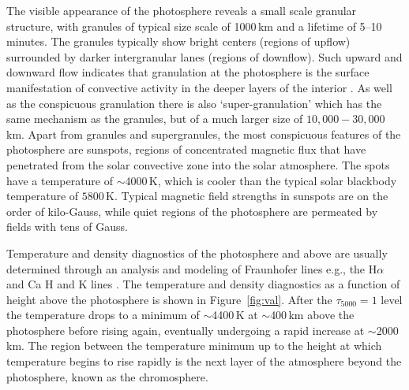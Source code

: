 The visible appearance of the photosphere reveals a small scale granular structure, with granules of typical size scale of 1000\,km and a lifetime of 5--10 minutes. The granules typically show bright centers (regions of upflow) surrounded by darker intergranular lanes (regions of downflow). 
Such upward and downward flow indicates that granulation at the photosphere is the surface manifestation of convective activity in the deeper layers of the interior \citep{schrijver2008b}. As well as the conspicuous granulation there is also \textquoteleft super-granulation' which has the same mechanism as the granules, but of a much larger size of $10,000-30,000$\,km. Apart from granules and supergranules, the most conspicuous features of the photosphere are sunspots, regions of concentrated magnetic flux that have penetrated from the solar convective zone into the solar atmosphere. The spots have a temperature of $\sim$4000\,K, which is cooler than the typical solar blackbody temperature of $5800$\,K. Typical magnetic field strengths in sunspots are on the order of kilo-Gauss, while quiet regions of the photosphere are permeated by fields with tens of Gauss.

Temperature and density diagnostics of the photosphere and above are usually determined through an analysis and modeling of Fraunhofer lines e.g., the H$\alpha$ and Ca H and K lines \citep{vernazza1981, fontenla1988, gabriel1976}. The temperature and density diagnostics as a function of height above the photosphere is shown in Figure~\ref{fig:val}.  After the $\tau_{5000}=1$ level the temperature drops to a minimum of $\sim$4400\,K at $\sim$400\,km above the photosphere before rising again, eventually undergoing a rapid increase at $\sim$2000\,km. The region between the temperature minimum up to the height at which temperature begins to rise rapidly is the next layer of the atmosphere beyond the photosphere, known as the chromosphere.


